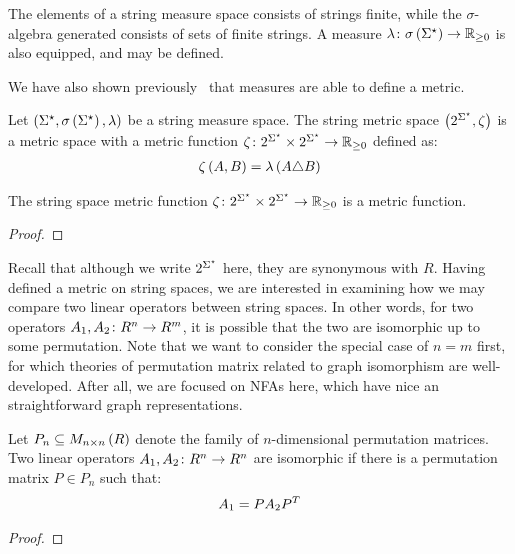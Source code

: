 \documentclass[12pt]{article}
\begin{document}
The elements of a string measure space consists of strings finite,
while the \(\sigma\)-algebra generated consists of sets of finite strings.
A measure \(\lambda \colon \sigma\left(\Sigma^\star\right) \to \mathbb{R}_{\geq 0}\) is also
equipped, and may be defined.

We have also shown previously~\cite{xue2018langmeasures} that
measures are able to define a metric.

\begin{definition}
  Let
  \(\left(\Sigma^\star, \sigma\left(\Sigma^\star\right), \lambda\right)\)
  be a string measure space.
  The string metric space \(\left(2^{\Sigma^\star}, \zeta\right)\) is
  a metric space with a metric function
  \(\zeta \colon 2^{\Sigma^\star} \times 2^{\Sigma^\star} \to \mathbb{R}_{\geq 0}\)
  defined as:
  \begin{align*}
    \zeta \left(A, B\right)
      = \lambda\left(A \triangle B\right)
  \end{align*}
\end{definition}
\begin{theorem}
  The string space metric function
  \(\zeta \colon 2^{\Sigma^\star} \times 2^{\Sigma^\star} \to \mathbb{R}_{\geq 0}\)
  is a metric function.
\end{theorem}
\begin{proof}
\end{proof}

Recall that although we write \(2^{\Sigma^\star}\) here,
they are synonymous with \(R\).
Having defined a metric on string spaces,
we are interested in examining how we may compare two linear operators
between string spaces.
In other words, for two operators
\(A_1, A_2 \colon R^n \to R^m\), it is possible that
the two are isomorphic up to some permutation.
Note that we want to consider the special case of \(n = m\) first,
for which theories of permutation matrix related to
graph isomorphism are well-developed.
After all, we are focused on NFAs here,
which have nice an straightforward graph representations.

\begin{theorem}
  Let \(P_n \subseteq M_{n \times n}\left(R\right)\)
  denote the family of \(n\)-dimensional permutation matrices.
  Two linear operators
  \(A_1, A_2 \colon R^n \to R^n\) are isomorphic if
  there is a permutation matrix
  \(P \in P_n\) such that:
  \begin{align*}
    A_1 = P A_2 {P}^{T}
  \end{align*}
\end{theorem}
\begin{proof}
\end{proof}
\end{document}
